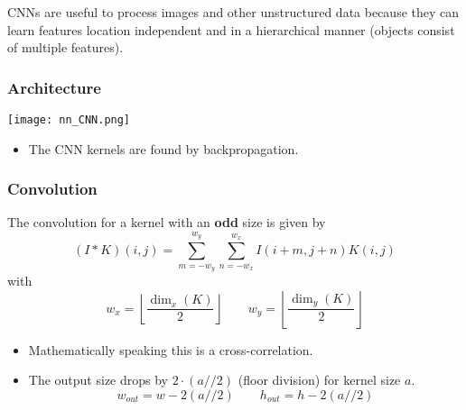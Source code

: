 CNNs are useful to process images and other unstructured data because they can learn features location independent and in a hierarchical manner (objects consist of multiple features).
\newpar{}

\subsubsection{Architecture}
\begin{center}
    \texttt{[image: nn\_CNN.png]}
\end{center}
\newpar{}
\begin{itemize}
    \item The CNN kernels are found by backpropagation.
\end{itemize}


\subsubsection{Convolution}
The convolution for a kernel with an \textbf{odd} size is given by
\begin{equation*}
    (I * K)(i,j) = \sum_{m=-w_y}^{w_y}\sum_{n=-w_x}^{w_x}I(i+m,j+n)K(i,j)
\end{equation*}
with
\begin{equation*}
    w_x = \left\lfloor \frac{\dim_x(K)}{2} \right\rfloor \qquad
    w_y = \left\lfloor \frac{\dim_y(K)}{2} \right\rfloor
\end{equation*}

\newpar{}
\begin{itemize}
    \item Mathematically speaking this is a cross-correlation.
    \item The output size drops by $2\cdot (a//2)$ (floor division) for kernel size $a$.
          \begin{equation*}
              w_{out}=  w-2(a//2) \qquad
              h_{out}=  h-2(a//2)
          \end{equation*}
\end{itemize}

